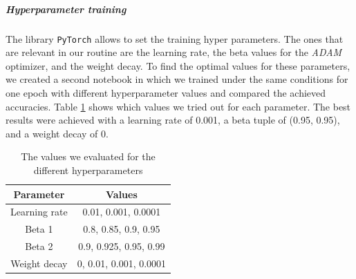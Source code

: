 \documentclass[11pt]{article}
\begin{document}
	\subparagraph{Hyperparameter training}
	The library \texttt{PyTorch} allows to set the training hyper parameters. The ones that are relevant in our routine are the learning rate, the beta values for the \textit{ADAM} optimizer, and the weight decay. To find the optimal values for these parameters, we created a second notebook in which we trained under the same conditions for one epoch with different hyperparameter values and compared the achieved accuracies. Table \ref{tab:hyperparams} shows which values we tried out for each parameter. The best results were achieved with a learning rate of 0.001, a beta tuple of (0.95, 0.95), and a weight decay of 0.
	\begin{table}[h!]
		\begin{tabular}{c|c}
			\textbf{Parameter} & \textbf{Values} \\
			\hline
			Learning rate & 0.01, 0.001, 0.0001 \\
			Beta 1 & 0.8, 0.85, 0.9, 0.95 \\
			Beta 2 & 0.9, 0.925, 0.95, 0.99 \\
			Weight decay & 0, 0.01, 0.001, 0.0001
		\end{tabular}
		\caption{The values we evaluated for the different hyperparameters}
		\label{tab:hyperparams}
	\end{table}
	
\end{document}
